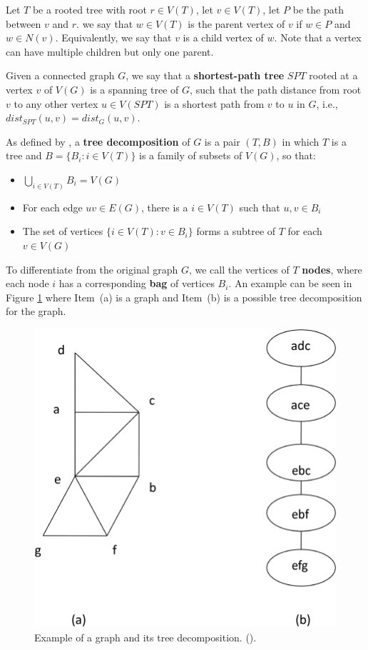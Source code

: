 Let \(T\) be a rooted tree with root \(r \in V(T)\), let \(v \in V(T)\), let \(P\) be the path between \(v\) and \(r\). we say that \(w \in V(T)\) is the parent vertex of \(v\) if \(w \in P\) and \(w \in N(v)\). Equivalently, we say that \(v\) is a child vertex of \(w\). Note that a vertex can have multiple children but only one parent.

Given a connected graph \(G\), we say that a \textbf{shortest-path tree} \(SPT\) rooted at a vertex \(v\) of \(V(G)\) is a spanning tree of \(G\), such that the path distance from root \(v\) to any other vertex \(u \in V(SPT)\) is a shortest path from \(v\) to \(u\) in \(G\), i.e., \(dist_{SPT}(u, v) = dist_{G}(u, v)\).

As defined by \cite{ROBERTSON1986309}, a \textbf{tree decomposition} of \(G\) is a pair \((T, B)\) in which \(T\) is a tree and \(B = \{B_i \colon i \in V(T)\}\) is a family of subsets of \(V(G)\), so that:

\begin{itemize}
    \item \(\bigcup_{i \in V(T)} B_i = V(G)\)
    \item For each edge \(uv \in E(G)\), there is a \(i \in V(T)\) such that \(u, v \in B_i\)
    \item The set of vertices \(\{i \in V(T) \colon v \in B_i\}\) forms a subtree of \(T\) for each \(v \in V(G)\)
\end{itemize}

To differentiate from the original graph \(G\), we call the vertices of \(T\) \textbf{nodes}, where each node \(i\) has a corresponding \textbf{bag} of vertices \(B_i\). An example can be seen in Figure \ref{fig:decomp1} where Item~(a) is a graph and Item~(b) is a possible tree decomposition for the graph.

\begin{figure}[H]
    \centering
    \includegraphics[scale=2]{imgs/decomp1.png}
    \caption{Example of a graph and its tree decomposition. (\cite{imgTreeDecomp}).}
    \label{fig:decomp1}
\end{figure}

